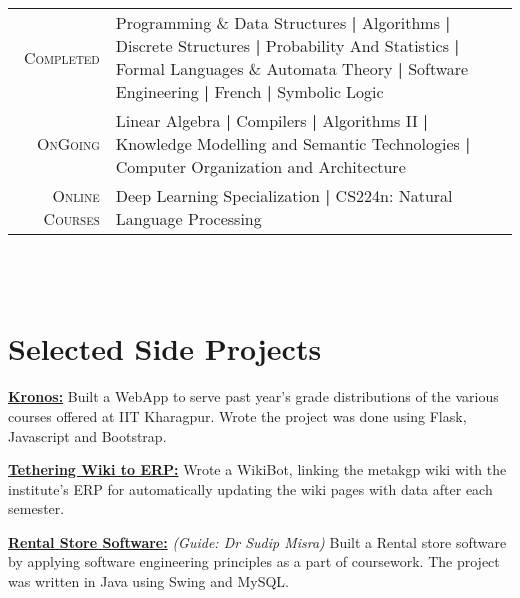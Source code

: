 \documentclass[a4paper,10pt]{extarticle} %
\begin{document}

\begin{tabular}{r|p{15cm}}
\textsc{Completed} & Programming \& Data Structures \textbf{|} Algorithms \textbf{|} Discrete Structures \textbf{|} Probability And Statistics \textbf{|} Formal Languages \& Automata Theory \textbf{|} Software Engineering \textbf{|} French \textbf{|} Symbolic Logic \\
\textsc{OnGoing} & Linear Algebra \textbf{|} Compilers \textbf{|} Algorithms II  \textbf{|} Knowledge Modelling and Semantic Technologies \textbf{|} Computer Organization and Architecture \\
\textsc{Online Courses} & Deep Learning Specialization \textbf{|}  CS224n: Natural Language Processing \\
\end{tabular}
\\
\\





\vspace{-0.3cm}
\section{\textcolor{primary}{Selected Side Projects}}

\textbf{\href{https://github.com/metakgp/kronos}{Kronos:}} Built a WebApp to serve past year's grade distributions of the various courses offered at IIT Kharagpur. Wrote the project was done using Flask, Javascript and Bootstrap. 

\textbf{\href{https://github.com/metakgp/twerp}{Tethering Wiki to ERP:}} Wrote a WikiBot, linking the metakgp wiki with the institute's ERP for automatically updating the wiki pages with data after each semester.

\textbf{\href{https://github.com/Ayushk4/Rental-Store-Software}{Rental Store Software:}} \textit{(Guide: Dr Sudip Misra)}
Built a Rental store software by applying software engineering principles as a part of coursework. The project was written in Java using Swing and MySQL.
\end{document}
